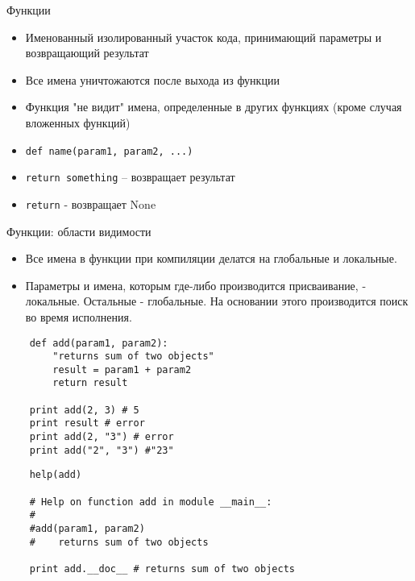 \documentclass{article}
\begin{document}
\LARGE

\begin{center}Функции\end{center}
\begin{itemize}
    \item Именованный изолированный участок кода,
        принимающий параметры и возвращающий результат
    \item Все имена уничтожаются после выхода из функции
    \item Функция "не видит" имена, определенные в других 
        функциях (кроме случая вложенных функций)
    \item \lstinline!def name(param1, param2, ...)!
    \item \lstinline!return something! – возвращает результат
    \item \lstinline!return! - возвращает None
\end{itemize}
\newpage

\begin{center} Функции: области видимости \end{center}
\begin{itemize}
    \item Все имена в функции при компиляции делатся на глобальные и локальные.
    \item Параметры и имена, которым где-либо производится присваивание, - локальные.
          Остальные - глобальные. На основании этого производится поиск во время исполнения.
\end{itemize}
\vspace{15pt}
\begin{lstlisting}
    def add(param1, param2):
        "returns sum of two objects"
        result = param1 + param2
        return result

    print add(2, 3) # 5
    print result # error
    print add(2, "3") # error
    print add("2", "3") #"23"
\end{lstlisting}
\newpage

\vspace{15pt}
\begin{lstlisting}
    help(add)
    
    # Help on function add in module __main__:
    #
    #add(param1, param2)
    #    returns sum of two objects

    print add.__doc__ # returns sum of two objects
\end{lstlisting}
\newpage
\end{document}
